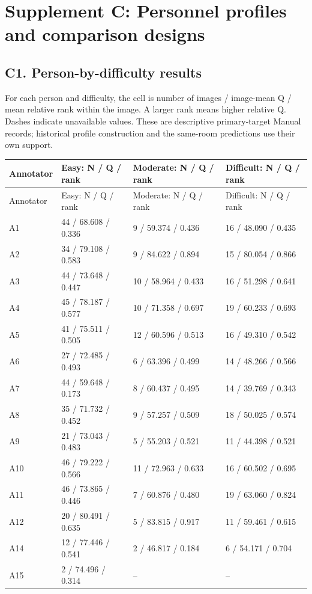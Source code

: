 \documentclass[10pt]{article}
\begin{document}
\section*{Supplement C: Personnel profiles and comparison designs}
\subsection*{C1. Person-by-difficulty results}
For each person and difficulty, the cell is number of images / image-mean Q / mean relative rank within the image. A larger rank means higher relative Q. Dashes indicate unavailable values. These are descriptive primary-target Manual records; historical profile construction and the same-room predictions use their own support.
\begin{longtable}{llll}
\toprule Annotator & Easy: N / Q / rank & Moderate: N / Q / rank & Difficult: N / Q / rank \\
\midrule\endfirsthead\toprule Annotator & Easy: N / Q / rank & Moderate: N / Q / rank & Difficult: N / Q / rank \\
\midrule\endhead
A1 & 44 / 68.608 / 0.336 & 9 / 59.374 / 0.436 & 16 / 48.090 / 0.435 \\
A2 & 34 / 79.108 / 0.583 & 9 / 84.622 / 0.894 & 15 / 80.054 / 0.866 \\
A3 & 44 / 73.648 / 0.447 & 10 / 58.964 / 0.433 & 16 / 51.298 / 0.641 \\
A4 & 45 / 78.187 / 0.577 & 10 / 71.358 / 0.697 & 19 / 60.233 / 0.693 \\
A5 & 41 / 75.511 / 0.505 & 12 / 60.596 / 0.513 & 16 / 49.310 / 0.542 \\
A6 & 27 / 72.485 / 0.493 & 6 / 63.396 / 0.499 & 14 / 48.266 / 0.566 \\
A7 & 44 / 59.648 / 0.173 & 8 / 60.437 / 0.495 & 14 / 39.769 / 0.343 \\
A8 & 35 / 71.732 / 0.452 & 9 / 57.257 / 0.509 & 18 / 50.025 / 0.574 \\
A9 & 21 / 73.043 / 0.483 & 5 / 55.203 / 0.521 & 11 / 44.398 / 0.521 \\
A10 & 46 / 79.222 / 0.566 & 11 / 72.963 / 0.633 & 16 / 60.502 / 0.695 \\
A11 & 46 / 73.865 / 0.446 & 7 / 60.876 / 0.480 & 19 / 63.060 / 0.824 \\
A12 & 20 / 80.491 / 0.635 & 5 / 83.815 / 0.917 & 11 / 59.461 / 0.615 \\
A14 & 12 / 77.446 / 0.541 & 2 / 46.817 / 0.184 & 6 / 54.171 / 0.704 \\
A15 & 2 / 74.496 / 0.314 & -- & -- \\

\end{longtable}
\end{document}
